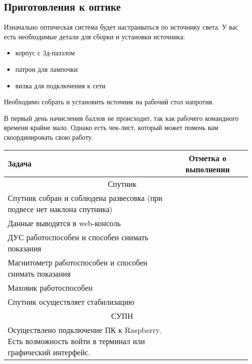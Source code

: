 \subsection*{Приготовления к оптике}

Изначально оптическая система будет настраиваться по источнику света. У вас есть необходимые детали для сборки и установки источника:
\begin{itemize}
    \item корпус с 3д-паззлом
    \item патрон для лампочки
    \item вилка для подключения к сети
\end{itemize}

Необходимо собрать и установить источник на рабочий стол напротив.

\markSection

В первый день начисления баллов не происходит, так как рабочего командного времени крайне мало. Однако есть чек-лист, который может помочь вам скоординировать свою работу.

\begin{table}[H]
    \center
    \begin{tabular}{|p{10cm}|c|c|}
        \hline
        Задача & 	Отметка о выполнении\\
        \hline
        \multicolumn{2}{|c|}{Спутник} \\
        \hline
        Спутник собран и соблюдена развесовка (при подвесе нет наклона спутника)& \\
        \hline	
        Данные выводятся в web-консоль& 	\\
        \hline
        ДУС работоспособен и способен снимать показания& 	\\
        \hline
        Магнитометр работоспособен и способен снимать показания& 	\\
        \hline
        Маховик работоспособен& 	\\
        \hline
        Спутник осуществляет стабилизацию& 	\\
        \hline
        \multicolumn{2}{|c|}{СУПН} \\
        \hline
        Осуществлено подключение ПК к Raspberry. Есть возможность войти в терминал или графический интерфейс.& \\
        \hline	
    \end{tabular}
\end{table}